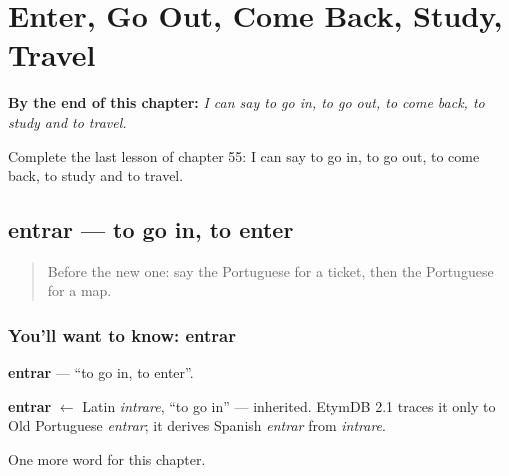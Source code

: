 
\chapter{Enter, Go Out, Come Back, Study, Travel}
\label{ch:pt-enter-go-out-come-back-study-travel}

\begin{chapteropening}
\textbf{By the end of this chapter:} \emph{I can say to go in, to go out, to come back, to study and to travel.}

Complete the last lesson of chapter 55: I can say to go in, to go out, to come back, to study and to travel.
\end{chapteropening}

\section[entrar]{entrar — to go in, to enter}

\label{lesson:PT-C55-entrar}



\begin{quote}
Before the new one: say the Portuguese for a ticket, then the Portuguese for a map.
\end{quote}

\subsection*{You'll want to know: entrar}
\textbf{entrar} — \textquotedblleft{}to go in, to enter\textquotedblright{}.

\begin{cousinweb}
\textbf{entrar} $\leftarrow$ Latin \emph{intrare}, \textquotedblleft{}to go in\textquotedblright{} — inherited. EtymDB 2.1 traces it only to Old Portuguese \emph{entrar}; it derives Spanish \emph{entrar} from \emph{intrare}.
\end{cousinweb}

\begin{grammarlens}[title={What you've built}]
One more word for this chapter.
\end{grammarlens}

